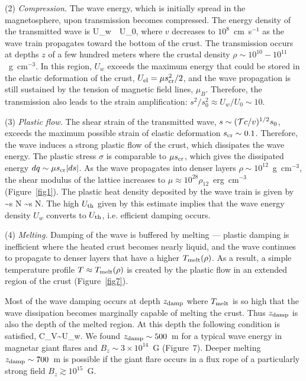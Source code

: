 (2) {\it Compression.}
The wave energy, which is initially spread in the magnetosphere, upon transmission becomes compressed. The energy density of the transmitted wave is
\beq 
   U_w\approx \T\,  \, U_0, 
\eeq
where $v$ decreases to $10^8$~cm~s$^{-1}$ as the wave train propagates toward the bottom of the crust. The transmission occurs at depths $z$ of a few hundred meters where the crustal density $\rho\sim 10^{10}-10^{11}$~g~cm$^{-3}$. 
In this region, $U_w$ exceeds the maximum energy that could be stored in the elastic deformation of the crust, $U_{\rm el}=\mu s_{\rm cr}^2/2$, and the wave propagation is still sustained by the tension of magnetic field lines, $\mu_B$. 
Therefore, the transmission also leads to the strain amplification: $s^2/s_0^2\approx U_w/U_0\sim 10$.

(3) {\it Plastic flow.}
The shear strain of the transmitted wave, $s\sim ({\mathcal T} c/v)^{1/2} s_0$, exceeds the maximum possible strain of elastic deformation $s_{\rm cr}\sim 0.1$. 
Therefore, the wave induces a strong plastic flow of the crust, which dissipates the wave energy. 
The plastic stress $\sigma$ is comparable to $\mu s_{\rm cr}$, which gives the dissipated energy $dq\sim \mu s_{\rm cr} |ds|$.
As the wave propagates into denser layers $\rho\sim 10^{12}$~g~cm$^{-3}$, the shear modulus of the lattice increases to $\mu\approx 10^{28}\rho_{12}$~erg~cm$^{-3}$ (Figure~\ref{fig1}).
The plastic heat density deposited by the wave train is given by
\beq
   \Uth \sim \sigma s N \sim \mu \scr s N.
\eeq  
The high $U_{\rm th}$ given by this estimate implies that the wave energy density $U_w$ converts to $U_{\rm th}$, i.e. efficient damping occurs.

(4) {\it Melting.}
Damping of the wave is buffered by melting --- plastic damping is inefficient where the heated crust becomes nearly liquid, and the wave continues to propagate to denser layers that have a higher $T_{\rm melt}(\rho)$. 
As a result, a simple temperature profile $T\approx T_{\rm melt}(\rho)$ is created by the plastic flow in an extended region of the crust (Figure~\ref{fig7}). 

Most of the wave damping occurs at depth $z_{\rm damp}$ where $T_{\rm melt}$ is so high that the wave dissipation becomes marginally capable of melting the crust. 
Thus $z_{\rm damp}$ is also the depth of the melted region. At this depth the following condition is satisfied,
\beq
   C_V\Tm\sim U_w.
\eeq
We found $z_{\rm damp}\sim 500$~m for a typical wave energy in magnetar giant flares and $B_z\sim 3\times 10^{14}$~G (Figure~7). Deeper melting $z_{\rm damp}\sim 700$~m is possible if the giant flare occurs in a flux rope of a particularly strong field $B_z\gtrsim 10^{15}$~G.

